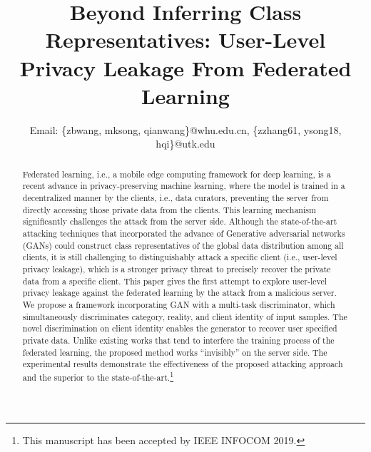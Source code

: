 \documentclass[10pt, conference, letterpaper]{IEEEtran}
\begin{document}
\title{
Beyond Inferring Class Representatives: User-Level Privacy Leakage From Federated Learning
}


\author{
Email: \{zbwang, mksong, qianwang\}@whu.edu.cn, \{zzhang61, ysong18, hqi\}@utk.edu
}



\maketitle
\IEEEpeerreviewmaketitle

\begin{abstract}
Federated learning, i.e., a mobile edge computing framework for deep learning, is a recent advance in privacy-preserving machine learning, where the model is trained in a decentralized manner by the clients, i.e., data curators, preventing the server from directly accessing those private data from the clients. This learning mechanism significantly challenges the attack from the server side. Although the state-of-the-art attacking techniques that incorporated the advance of Generative adversarial networks (GANs) could construct class representatives of the global data distribution among all clients, it is still challenging to distinguishably attack a specific client (i.e., user-level privacy leakage), which is a stronger privacy threat to precisely recover the private data from a specific client. This paper gives the first attempt to explore user-level privacy leakage against the federated learning by the attack from a malicious server. We propose a framework incorporating GAN with a multi-task discriminator, which simultaneously discriminates category, reality, and client identity of input samples. The novel discrimination on client identity enables the generator to recover user specified private data. Unlike existing works that tend to interfere the training process of the federated learning, the proposed method works ``invisibly'' on the server side. The experimental results demonstrate the effectiveness of the proposed attacking approach and the superior to the state-of-the-art.\footnote{This manuscript has been accepted by IEEE INFOCOM 2019.}
\end{abstract}
\end{document}
